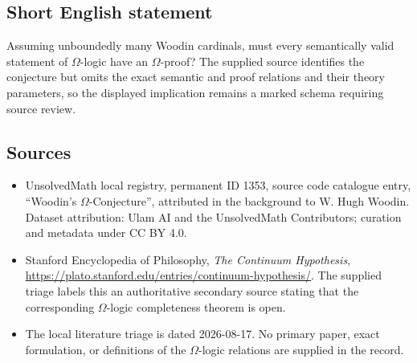\documentclass[11pt]{article}
\begin{document}
\subsection{Short English statement}
Assuming unboundedly many Woodin cardinals, must every semantically valid statement of $\Omega$-logic have an $\Omega$-proof? The supplied source identifies the conjecture but omits the exact semantic and proof relations and their theory parameters, so the displayed implication remains a marked schema requiring source review.
\subsection{Sources}
\begin{itemize}
\item UnsolvedMath local registry, permanent ID 1353, source code catalogue entry, ``Woodin's $\Omega$-Conjecture'', attributed in the background to W. Hugh Woodin. Dataset attribution: Ulam AI and the UnsolvedMath Contributors; curation and metadata under CC BY 4.0.
\item Stanford Encyclopedia of Philosophy, \emph{The Continuum Hypothesis}, \url{https://plato.stanford.edu/entries/continuum-hypothesis/}. The supplied triage labels this an authoritative secondary source stating that the corresponding $\Omega$-logic completeness theorem is open.
\item The local literature triage is dated 2026-08-17. No primary paper, exact formulation, or definitions of the $\Omega$-logic relations are supplied in the record.
\end{itemize}
\end{document}
